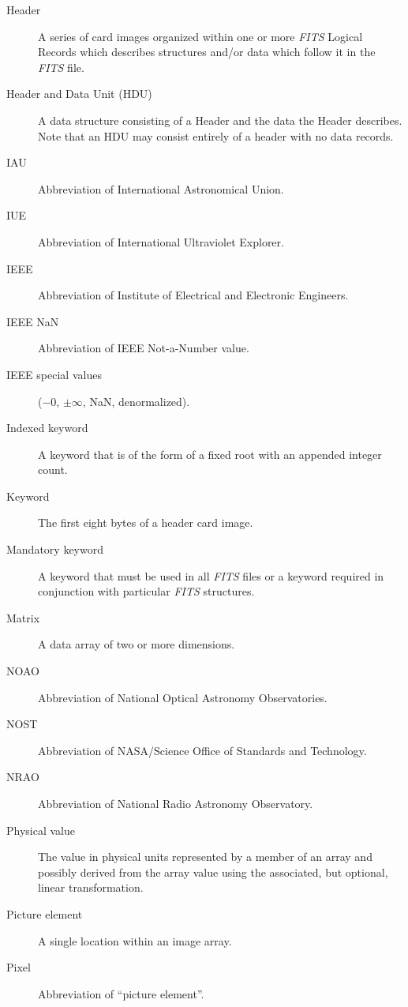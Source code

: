 \begin{description}
\item[Header] A series of card images organized within 
       one or more {\em FITS\/}
       Logical Records which describes structures 
       and/or data which follow it in the {\em FITS\/} file.
\item[Header and Data Unit (HDU)] A data structure 
       consisting of a
       Header and the data the Header describes. Note that an
       HDU may consist entirely of a header with no data records.
\item[IAU] Abbreviation of International Astronomical Union.
\item[IUE] Abbreviation of International Ultraviolet Explorer.
\item[IEEE] Abbreviation of Institute of Electrical and 
        Electronic Engineers.
\item[IEEE NaN] Abbreviation of IEEE Not-a-Number 
        value.
\item[IEEE special values] 
        ($-0$, $\pm \infty$, NaN,
	denormalized).
\item[Indexed keyword] A keyword that is 
       of the form of a fixed root with an appended integer count.
\item[Keyword] The first eight bytes of a header card image.
\item[Mandatory keyword] A keyword that must 
   be used in all {\em FITS\/} files or a keyword required 
   in conjunction with particular {\em FITS\/}
   structures.
\item[Matrix] A data array of two or more dimensions.
\item[NOAO] Abbreviation of National Optical Astronomy
Observatories.
\item[NOST] Abbreviation of NASA/Science Office of Standards and 
       Technology.
\item[NRAO] Abbreviation of National Radio Astronomy 
        Observatory.
\item[Physical value] The value in physical 
   units represented by a member
   of an array and possibly derived from the array value 
   using the associated, but optional, linear transformation.
\item[Picture element] A single location within an image array.
\item[Pixel] Abbreviation of ``picture element''.

\end{description}
